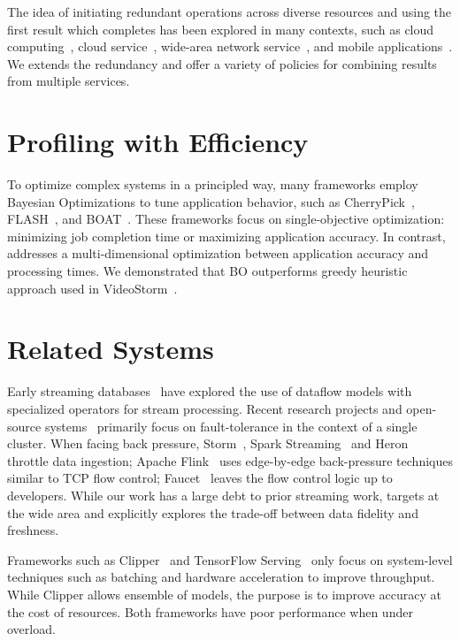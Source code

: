 \documentclass[thesis.tex]{subfiles}
\begin{document}
 The idea of initiating redundant operations
across diverse resources and using the first result which completes has been
explored in many contexts, such as cloud
computing~\cite{ananthanarayanan2013effective}, cloud
service~\cite{dean2013tail}, wide-area network service~\cite{vulimiri2013low},
and mobile applications~\cite{gordon2015accelerating}. We extends the redundancy
and offer a variety of policies for combining results from multiple services.

\section{Profiling with Efficiency}
\label{sec:prof-with-effic}

 To optimize complex systems in a principled way,
many frameworks employ Bayesian Optimizations to tune application behavior, such
as CherryPick~\cite{alipourfard2017cherrypick}, FLASH~\cite{zhang2016flash}, and
BOAT~\cite{dalibard2017boat}. These frameworks focus on single-objective
optimization: minimizing job completion time or maximizing application
accuracy. In contrast, \sysname{} addresses a multi-dimensional optimization
between application accuracy and processing times. We demonstrated that BO
outperforms greedy heuristic approach used in VideoStorm~\cite{zhang2017live}.

\section{Related Systems}
\label{sec:related-systems}

 Early streaming
databases~\cite{abadi2005design, chandrasekaran2003telegraphcq} have explored
the use of dataflow models with specialized operators for stream
processing. Recent research projects and open-source
systems~\cite{akidau2013millwheel, toshniwal2014storm, sanjeev2015twitter,
  zaharia2013discretized, carbone2015apache} primarily focus on fault-tolerance
in the context of a single cluster. When facing back pressure,
Storm~\cite{toshniwal2014storm}, Spark Streaming~\cite{zaharia2013discretized}
and Heron~\cite{sanjeev2015twitter} throttle data ingestion; Apache
Flink~\cite{carbone2015apache} uses edge-by-edge back-pressure techniques
similar to TCP flow control; Faucet~\cite{lattuada2016faucet} leaves the flow
control logic up to developers.  While our work has a large debt to prior
streaming work, \sysname{} targets at the wide area and explicitly explores the
trade-off between data fidelity and freshness.

 Frameworks such as Clipper~\cite{crankshaw2017clipper} and
TensorFlow Serving~\cite{tensorflow2017serving} only focus on system-level
techniques such as batching and hardware acceleration to improve
throughput. While Clipper allows ensemble of models, the purpose is to improve
accuracy at the cost of resources. Both frameworks have poor performance when
under overload.

\printbibliography
\end{document}
